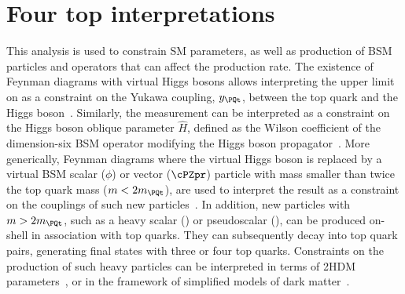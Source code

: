 \section{Four top interpretations}
\label{sec:ftinterpretations}

This analysis is used to constrain SM parameters, as well as production of
BSM particles and operators that can affect the \tttt production rate. The
existence of \tttt Feynman diagrams with virtual Higgs bosons allows
interpreting the upper limit on \xsectttt as a constraint on the Yukawa
coupling, $y_{\PQt}$, between the top quark and the Higgs
boson~\cite{THEORY:TopYukawaTTTT, THEORY:TopYukawaTTTTnew}. Similarly, the
measurement can be interpreted as a constraint on the Higgs boson oblique
parameter $\hat{H}$, defined as the Wilson coefficient of the dimension-six
BSM operator modifying the Higgs boson propagator~\cite{THEORY:ObliqueHiggs2019}.
More generically, Feynman diagrams where the virtual Higgs boson is replaced
by a virtual BSM scalar ($\phi$) or vector ($\cPZpr$) particle with mass
smaller than twice the top quark mass ($m < 2m_\PQt$), are used to interpret
the result as a constraint on the couplings of such new
particles~\cite{THEORY:Alvarez2016nrz}. In addition, new particles with $m >
2m_\PQt$, such as a heavy scalar (\PH) or pseudoscalar (\PSA), can be
produced on-shell in association with top quarks. They can subsequently decay
into top quark pairs, generating final states with three or four top quarks.
Constraints on the production of such heavy particles can be interpreted in
terms of 2HDM parameters~\cite{THEORY:Dicus1994bm,THEORY:Craig2015jba,THEORY:Craig2016ygr},
or in the framework of simplified models of dark matter~\cite{THEORY:Boveia2016mrp,
THEORY:Albert2017onk}.

